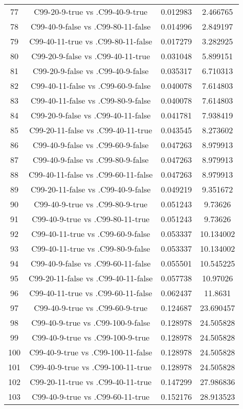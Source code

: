 \documentclass[a4paper,10pt]{article}
\begin{document}
\begin{landscape}
\begin{table}[!htp]
\begin{tabular}{cccc}
77&C99-20-9-true vs .C99-40-9-true&0.012983&2.466765\\
78&C99-40-9-false vs .C99-80-11-false&0.014996&2.849197\\
79&C99-40-11-true vs .C99-80-11-false&0.017279&3.282925\\
80&C99-20-9-false vs .C99-40-11-true&0.031048&5.899151\\
81&C99-20-9-false vs .C99-40-9-false&0.035317&6.710313\\
82&C99-40-11-false vs .C99-60-9-false&0.040078&7.614803\\
83&C99-40-11-false vs .C99-80-9-false&0.040078&7.614803\\
84&C99-20-9-false vs .C99-40-11-false&0.041781&7.938419\\
85&C99-20-11-false vs .C99-40-11-true&0.043545&8.273602\\
86&C99-40-9-false vs .C99-60-9-false&0.047263&8.979913\\
87&C99-40-9-false vs .C99-80-9-false&0.047263&8.979913\\
88&C99-40-11-false vs .C99-60-11-false&0.047263&8.979913\\
89&C99-20-11-false vs .C99-40-9-false&0.049219&9.351672\\
90&C99-40-9-true vs .C99-80-9-true&0.051243&9.73626\\
91&C99-40-9-true vs .C99-80-11-true&0.051243&9.73626\\
92&C99-40-11-true vs .C99-60-9-false&0.053337&10.134002\\
93&C99-40-11-true vs .C99-80-9-false&0.053337&10.134002\\
94&C99-40-9-false vs .C99-60-11-false&0.055501&10.545225\\
95&C99-20-11-false vs .C99-40-11-false&0.057738&10.97026\\
96&C99-40-11-true vs .C99-60-11-false&0.062437&11.8631\\
97&C99-40-9-true vs .C99-60-9-true&0.124687&23.690457\\
98&C99-40-9-true vs .C99-100-9-false&0.128978&24.505828\\
99&C99-40-9-true vs .C99-100-9-true&0.128978&24.505828\\
100&C99-40-9-true vs .C99-100-11-false&0.128978&24.505828\\
101&C99-40-9-true vs .C99-100-11-true&0.128978&24.505828\\
102&C99-20-11-true vs .C99-40-11-true&0.147299&27.986836\\
103&C99-40-9-true vs .C99-60-11-true&0.152176&28.913523\\

\end{tabular}
\end{table}
\end{landscape}
\end{document}
